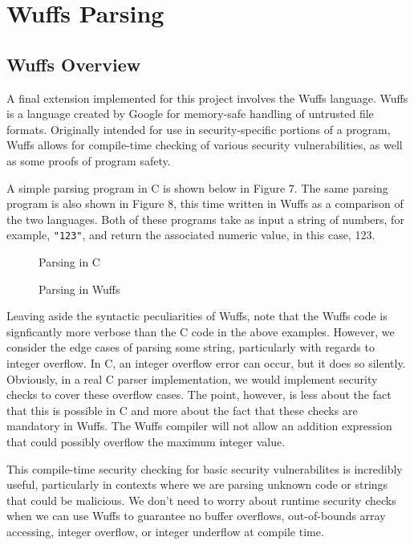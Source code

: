 \documentclass[main.tex]{subfiles}
\begin{document}
\section{Wuffs Parsing}

\subsection{Wuffs Overview}
A final extension implemented for this project involves the Wuffs language.
Wuffs is a language created by Google for memory-safe handling of untrusted file
formats. Originally intended for use in security-specific portions of a program,
Wuffs allows for compile-time checking of various security vulnerabilities, as
well as some proofs of program safety.

A simple parsing program in C is shown below in Figure 7. The same parsing program is also
shown in Figure 8, this time written in Wuffs as a comparison of the two languages. Both of these programs take
as input a string of numbers, for example, \verb|"123"|, and return the associated numeric value, in this case, 123.
\begin{singlespace}
    \begin{figure}[p!]
        
        \caption{Parsing in C}
    \end{figure}
    \begin{figure}[p!]
        
        \caption{Parsing in Wuffs}
    \end{figure}
\end{singlespace}
Leaving aside the syntactic peculiarities of Wuffs, note that the Wuffs code is
signficantly more verbose than the C code in the above examples. However, we
consider the edge cases of parsing some string, particularly with regards to
integer overflow. In C, an integer overflow error can occur, but it does so
silently. Obviously, in a real C parser implementation, we would implement
security checks to cover these overflow cases. The point, however, is less about
the fact that this is possible in C and more about the fact that these checks
are mandatory in Wuffs. The Wuffs compiler will not allow an addition expression
that could possibly overflow the maximum integer value.

This compile-time security checking for basic security vulnerabilites is
incredibly useful, particularly in contexts where we are parsing unknown code or
strings that could be malicious. We don't need to worry about runtime security
checks when we can use Wuffs to guarantee no buffer overflows, out-of-bounds 
array accessing, integer overflow, or integer underflow at compile time.
\end{document}
